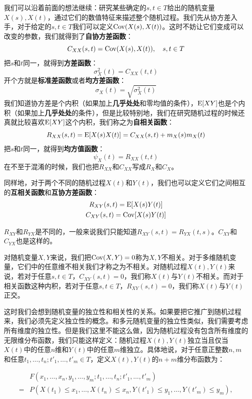 我们可以沿着前面的想法继续：研究某些确定的\(s,t\in T\)给出的随机变量\(X(s),X(t)\)，通过它们的数值特征来描述整个随机过程。我们先从协方差入手，对于给定的\(s,t\in T\)我们可以定义\(\operatorname{Cov}(X(s),X(t))\)。这时不妨让它们变成可以改变的参数，我们就得到了\textbf{自协方差函数}：
\[
C_{XX}(s, t) = \operatorname{Cov}(X(s),X(t)),\quad s,t\in T
\]
把\(s\)和\(t\)同一，就得到\textbf{方差函数}：
\[
\sigma^2_{X}(t) = C_{XX}(t, t)
\]
开个方就是\textbf{标准差函数}或者\textbf{均方差函数}：
\[
\sigma_{X}(t) = \sqrt{\sigma^2_{X}(t)}
\]
我们知道协方差是个内积（如果加上\textbf{几乎处处}和零均值的条件），\(\operatorname{E}[XY]\)也是个内积（如果加上\textbf{几乎处处}的条件），但是比较特别地，我们在研究随机过程的时候还真就比较喜欢\(\operatorname{E}[XY]\)这个内积，我们称之为\textbf{自相关函数}：
\[
R_{XX}(s,t)=\operatorname{E}[X(s)X(t)] = C_{XX}(s,t)+m_X(s)m_X(t)
\]
把\(s\)和\(t\)同一，就得到\textbf{均方值函数}：
\[
\psi_X(t)=R_{XX}(t,t)
\]
在不至于混淆的时候，我们也把\(R_{XX}\)和\(C_{XX}\)写成\(R_X\)和\(C_X\)。

同样地，对于两个不同的随机过程\(X(t)\)和\(Y(t)\)，我们也可以定义它们之间相互的\textbf{互相关函数}和\textbf{互协方差函数}：
\begin{gather*}
R_{XY}(s, t) = \operatorname{E}[X(s)Y(t)]\\
C_{XY}(s, t) = \operatorname{Cov}[X(s)Y(t)]
\end{gather*}
\begin{attention}
\(R_{XY}\)和\(R_{YX}\)是不同的，一般来说我们只能知道\(R_{XY}(s,t)=R_{YX}(t,s)\)。\(C_{XY}\)和\(C_{YX}\)也是这样的。
\end{attention}

对随机变量\(X,Y\)来说，我们把\(\operatorname{Cov}(X,Y)=0\)称为\(X,Y\)不相关。对于多维随机变量，它们中的任意维不相关我们才称之为不相关。对随机过程\(X(t),Y(t)\)来说，若对于任意\(s,t\in T\)，\(C_{XY}(s,t)=0\)，我们称\(X(t)\)与\(Y(t)\)不相关。而对于相关函数这种内积，若对于任意\(s,t\in T\)，\(R_{XY}(s,t)=0\)，我们称\(X(t)\)与\(Y(t)\)正交。

这时我们会想到随机变量的独立性和相关性的关系。如果要把它推广到随机过程来，我们必须先定义独立性的概念。和多元随机变量的独立性类似，我们需要考虑所有维度的独立性。但是我们这里不能这么做，因为随机过程没有包含所有维度的无限维分布函数，我们只能这样定义：随机过程\(X(t),Y(t)\)独立当且仅当\(X(t)\)中的任意\(n\)维和\(Y(t)\)中的任意\(m\)维独立。具体地说，对于任意正整数\(n,m\)和任意\(t_1,\ldots,t_n;t'_1,\ldots,t'_m\in T\)，定义\(X(t),Y(t)\)的\(n+m\)维分布函数为：

\begin{align*}
&F(x_1,\ldots,x_n, y_1,\ldots,y_m;t_1,\ldots,t_n; t'_1,\ldots,t'_m)\\
= &P\left( X(t_1) \le x_1, \ldots, X(t_n) \le x_n, Y(t'_1) \le y_1, \ldots, Y(t'_m) \le y_m \right),
\end{align*}

